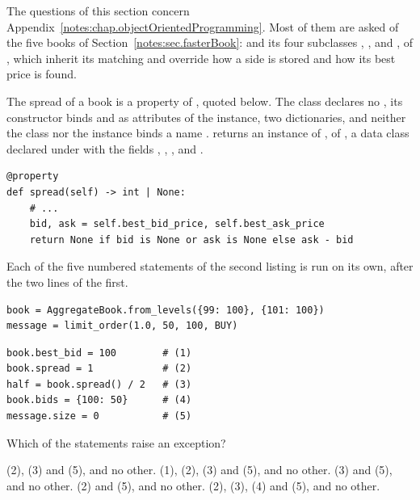 The questions of this section concern Appendix~\ref{notes:chap.objectOrientedProgramming}.
Most of them are asked of the five books of Section~\ref{notes:sec.fasterBook}:
 and its four subclasses
, ,  and ,
of ,
which inherit its matching
and override how a side is stored and how its best price is found.

\begin{question}
\label{question.writesToABookAndAMessage}
The spread of a book is a property of , quoted below.
The class declares no ,
its constructor binds  and  as attributes of the instance,
two dictionaries,
and neither the class nor the instance binds a name .
 returns an instance of , of ,
a data class declared under 
with the fields , , ,  and .
\begin{lstlisting}[caption={\protect\codehl{unito26.lob.orderbook.AggregateBook}: the spread, its docstring elided.}, label=listing.writesToABookAndAMessageSpread]
@property
def spread(self) -> int | None:
    # ...
    bid, ask = self.best_bid_price, self.best_ask_price
    return None if bid is None or ask is None else ask - bid
\end{lstlisting}
Each of the five numbered statements of the second listing is run on its own,
after the two lines of the first.
\begin{lstlisting}[caption={A book and a message}, label=listing.writesToABookAndAMessageSetUp]
book = AggregateBook.from_levels({99: 100}, {101: 100})
message = limit_order(1.0, 50, 100, BUY)
\end{lstlisting}
\begin{lstlisting}[caption={Five statements, each run on its own}, label=listing.writesToABookAndAMessageStatements]
book.best_bid = 100        # (1)
book.spread = 1            # (2)
half = book.spread() / 2   # (3)
book.bids = {100: 50}      # (4)
message.size = 0           # (5)
\end{lstlisting}
Which of the statements raise an exception?
\begin{choices}
 \correctchoice (2), (3) and (5), and no other.
 \choice (1), (2), (3) and (5), and no other.
 \choice (3) and (5), and no other.
 \choice (2) and (5), and no other.
 \choice (2), (3), (4) and (5), and no other.
\end{choices}
\end{question}

